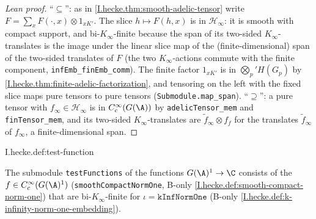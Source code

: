 \begin{proof}[Lean proof]
``$\subseteq$'': as in \cref{I.hecke.thm:smooth-adelic-tensor} write $F=\sum_x F(\cdot,x)\otimes1_{xK'}$. The slice $h\mapsto F(h,x)$ is in $\mathcal H_\infty$: it is smooth with compact support, and bi-$K_\infty$-finite because the span of its two-sided $K_\infty$-translates is the image under the linear slice map of the (finite-dimensional) span of the two-sided translates of $F$ (the two $K_\infty$-actions commute with the finite component, \texttt{infEmb\_finEmb\_comm}). The finite factor $1_{xK'}$ is in $\bigotimes_p'H(G_p)$ by \cref{I.hecke.thm:finite-adelic-factorization}, and tensoring on the left with the fixed slice maps pure tensors to pure tensors (\texttt{Submodule.map\_span}). ``$\supseteq$'': a pure tensor with $f_\infty\in\mathcal H_\infty$ is in $C_c^\infty(G(\A))$ by \texttt{adelicTensor\_mem} and \texttt{finTensor\_mem}, and its two-sided $K_\infty$-translates are $\tilde f_\infty\otimes f_f$ for the translates $\tilde f_\infty$ of $f_\infty$, a finite-dimensional span.
\end{proof}

\begin{definition}
\end{definition}
\begin{tfformal}{I.hecke.def:test-function}
\begin{tffidelity}
The submodule \texttt{testFunctions} of the functions $G(\A)^1\to\C$ consists of the $f\in C_c^\infty(G(\A)^1)$ (\texttt{smoothCompactNormOne}, B-only \cref{I.hecke.def:smooth-compact-norm-one}) that are bi-$K_\infty$-finite for $\iota=\texttt{kInfNormOne}$ (B-only \cref{I.hecke.def:k-infinity-norm-one-embedding}).
\end{tffidelity}
\end{tfformal}

